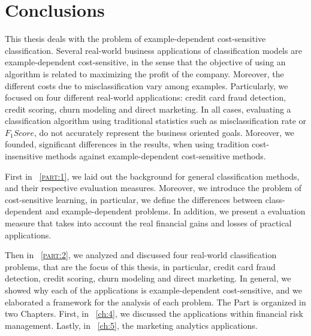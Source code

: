 \chapter{Conclusions}\label{ch:10}

This thesis deals with the problem of example-dependent cost-sensitive classification.
Several real-world business applications of classification models are example-dependent 
cost-sensitive, in the sense that the objective of using an algorithm is related to maximizing the 
profit of the company. Moreover, the different costs due to misclassification vary among examples. 
Particularly, we focused on four different real-world applications: credit card fraud 
detection, credit scoring, churn modeling and direct marketing. In all cases, evaluating a 
classification algorithm using traditional statistics such as misclassification rate or $F_1Score$, 
do not accurately represent the business oriented goals. Moreover, we founded, significant 
differences in the results, when using tradition cost-insensitive methods against example-dependent 
cost-sensitive methods.

First in \partname{~\textsc{\ref{part:1}}}, we laid out the background for general classification 
methods, and their respective evaluation measures. Moreover, we introduce the problem of 
cost-sensitive learning, in particular, we define the differences between class-dependent and 
example-dependent problems. In addition, we present a evaluation measure that takes into account 
the real financial gains and losses of practical applications.

Then in \partname{~\textsc{\ref{part:2}}}, we analyzed and discussed four real-world 
classification problems, that are the focus of this thesis, in particular, credit card fraud 
detection, credit scoring, churn modeling and direct marketing. In general, we showed why each of 
the applications is example-dependent cost-sensitive, and we elaborated a framework for the 
analysis of each problem. The Part is organized in two Chapters. First, in 
\chaptername{~\ref{ch:4}}, we discussed the applications within financial risk management. Lastly, 
in \chaptername{~\ref{ch:5}}, the marketing analytics applications.

